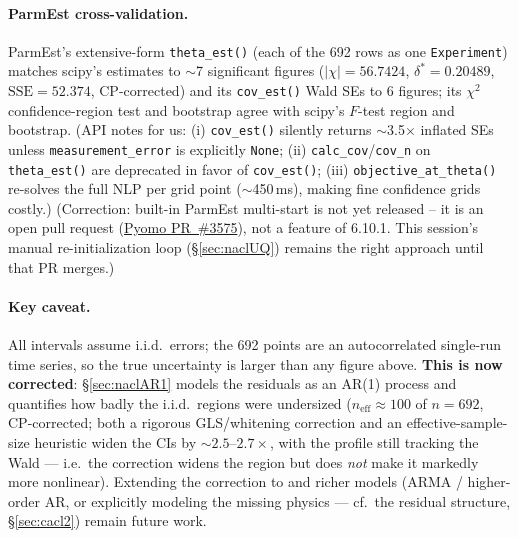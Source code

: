 \documentclass[11pt]{article}
\newcommand{\note}[1]{{\color{blue}\textsf{(#1)}}}
\newcommand{\dstar}{\delta^{*}}
\newcommand{\SSE}{\mathrm{SSE}}
\begin{document}
\paragraph{ParmEst cross-validation.} ParmEst's extensive-form \texttt{theta\_est()}
(each of the 692 rows as one \texttt{Experiment}) matches scipy's estimates to
$\sim$7 significant figures ($|\chi|=56.7424$, $\dstar=0.20489$, $\SSE=52.374$,
CP-corrected) and its \texttt{cov\_est()} Wald SEs to 6 figures; its $\chi^2$ confidence-region
test and bootstrap agree with scipy's $F$-test region and bootstrap. \note{API
notes for us: (i) \texttt{cov\_est()} silently returns $\sim$3.5$\times$ inflated
SEs unless \texttt{measurement\_error} is explicitly \texttt{None}; (ii)
\texttt{calc\_cov}/\texttt{cov\_n} on \texttt{theta\_est()} are deprecated in favor
of \texttt{cov\_est()}; (iii) \texttt{objective\_at\_theta()} re-solves the full
NLP per grid point ($\sim$450\,ms), making fine confidence grids costly.}
\note{Correction: built-in ParmEst multi-start is not yet released -- it is an
open pull request (\href{https://github.com/Pyomo/pyomo/pull/3575}{Pyomo
PR~\#3575}), not a feature of 6.10.1. This session's manual re-initialization
loop (\S\ref{sec:naclUQ}) remains the right approach until that PR merges.}

\paragraph{Key caveat.} All intervals assume i.i.d.\ errors; the 692 points are an
autocorrelated single-run time series, so the true uncertainty is larger than any
figure above. \textbf{This is now corrected}: \S\ref{sec:naclAR1} models the
residuals as an AR(1) process and quantifies how badly the i.i.d.\ regions were
undersized ($n_{\mathrm{eff}}\approx100$ of $n=692$, CP-corrected; both a rigorous
GLS/whitening correction and an effective-sample-size heuristic widen the CIs by
$\sim\!2.5$--$2.7\times$, with the profile still tracking the Wald --- i.e.\ the
correction widens the region but does \emph{not} make it markedly more nonlinear).
Extending the correction to  and richer models
(ARMA / higher-order AR, or explicitly modeling the missing physics --- cf.\
the  residual structure, \S\ref{sec:cacl2}) remain future work.
\end{document}
